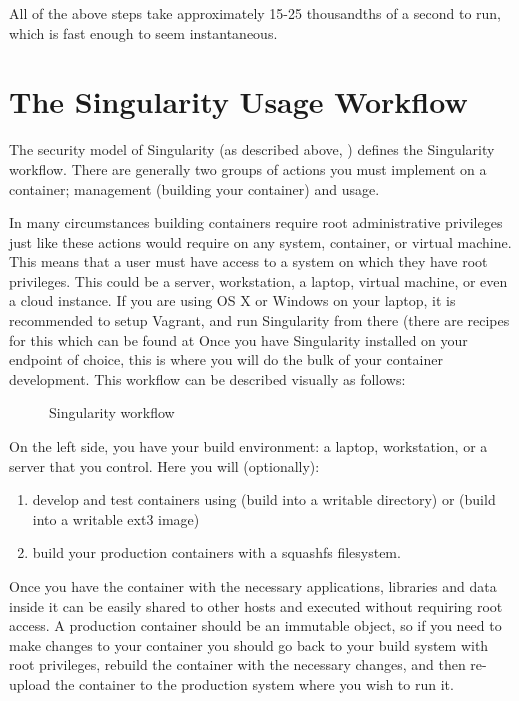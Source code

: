 \documentclass[letterpaper,10pt,english]{sphinxmanual}
\begin{document}
All of the above steps take approximately 15-25 thousandths of a second
to run, which is fast enough to seem instantaneous.


\section{The Singularity Usage Workflow}
\label{\detokenize{introduction:the-singularity-usage-workflow}}
The security model of Singularity (as described above, ) defines the
Singularity workflow. There are generally two groups of actions you
must implement on a container; management (building your container)
and usage.

In many circumstances building containers require root administrative
privileges just like these actions would require on any system,
container, or virtual machine. This means that a user must have access
to a system on which they have root privileges. This could be a
server, workstation, a laptop, virtual machine, or even a cloud
instance. If you are using OS X or Windows on your laptop, it is
recommended to setup Vagrant, and run Singularity from there (there
are recipes for this which can be found at Once you have Singularity
installed on your endpoint of choice, this is where you will do the
bulk of your container development. This workflow can be described
visually as follows:

\begin{figure}[htbp]
\centering
\capstart

\noindent{}
\caption{Singularity workflow}\label{\detokenize{introduction:id2}}\end{figure}

On the left side, you have your build environment: a laptop,
workstation, or a server that you control. Here you will (optionally):
\begin{enumerate}
\item {} 
develop and test containers using  (build into a writable directory)
or  (build into a writable ext3 image)

\item {} 
build your production containers with a squashfs filesystem.

\end{enumerate}

Once you have the container with the necessary applications, libraries
and data inside it can be easily shared to other hosts and executed
without requiring root access. A production container should be an
immutable object, so if you need to make changes to your container you
should go back to your build system with root privileges, rebuild the
container with the necessary changes, and then re-upload the container
to the production system where you wish to run it.
\end{document}
